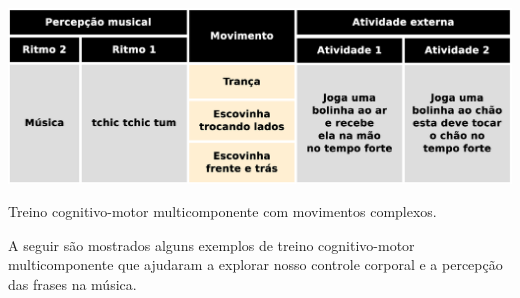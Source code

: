 \begin{table}[!h]
  \centering
    \includegraphics[width=1.0\textwidth]{chapters/cap-body-control/treino-bolinha2.eps}
\caption{Treino cognitivo-motor multicomponente com movimentos complexos.}
\label{tab:treino-bolinha2}
\end{table}

A seguir são mostrados alguns exemplos de treino cognitivo-motor multicomponente 
que ajudaram a explorar nosso controle corporal e a percepção das frases na música.

